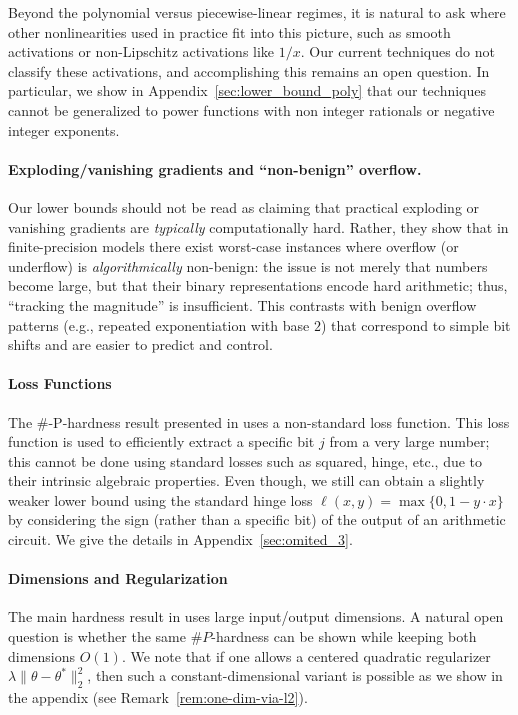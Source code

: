 \documentclass{article}
\theoremstyle{plain}
\theoremstyle{definition}
\theoremstyle{remark}
\begin{document}
Beyond the polynomial versus piecewise-linear regimes, it is natural to ask where other nonlinearities used in practice fit into this picture, such as smooth activations or non-Lipschitz activations like \(1/x\). Our current techniques do not classify these activations, and accomplishing this remains an open question. In particular, we show in Appendix~\ref{sec:lower_bound_poly} that our techniques cannot be generalized to power functions with non integer rationals or negative integer exponents. 

\paragraph*{Exploding/vanishing gradients and ``non-benign'' overflow.}
Our lower bounds should not be read as claiming that practical exploding or
vanishing gradients are \emph{typically} computationally hard. Rather, they show
that in finite-precision models there exist worst-case instances where overflow
(or underflow) is \emph{algorithmically} non-benign: the issue is not merely that
numbers become large, but that their binary representations encode hard
arithmetic; thus, ``tracking the magnitude'' is insufficient. This contrasts with
benign overflow patterns (e.g., repeated exponentiation with base $2$) that correspond
to simple bit shifts and are easier to predict and control.

\paragraph{Loss Functions} The $\#$-P-hardness result presented in  uses a non-standard loss function. This loss function is used to efficiently extract a specific bit $j$ from a very large number; this cannot be done using standard losses such as squared, hinge, etc., due to their intrinsic algebraic properties. Even though,  
we still can obtain a slightly weaker lower bound using the standard hinge loss $\ell(x,y) = \max\{0,1-y\cdot x\}$ by considering the sign (rather than a specific bit) of the output of an arithmetic circuit. We give the details in Appendix~\ref{sec:omited_3}.  


\paragraph{Dimensions and Regularization}
The main hardness result in  uses large input/output dimensions. A natural open
question is whether the same \(\#P\)-hardness can be shown while keeping both dimensions \(O(1)\). We note that if one allows a centered
quadratic regularizer \(\lambda\|\theta-\theta^\ast\|_2^2\), then such a
constant-dimensional variant is possible as we show in the appendix (see
Remark~\ref{rem:one-dim-via-l2}). 
\end{document}
